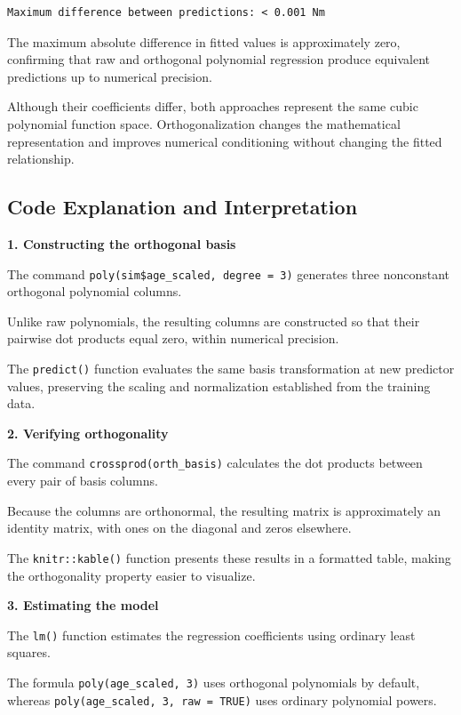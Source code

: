 \documentclass[
  letterpaper,
  DIV=11,
  numbers=noendperiod]{scrreprt}
\begin{document}
\begin{verbatim}
Maximum difference between predictions: < 0.001 Nm
\end{verbatim}

The maximum absolute difference in fitted values is approximately zero,
confirming that raw and orthogonal polynomial regression produce
equivalent predictions up to numerical precision.

Although their coefficients differ, both approaches represent the same
cubic polynomial function space. Orthogonalization changes the
mathematical representation and improves numerical conditioning without
changing the fitted relationship.

\subsection{Code Explanation and
Interpretation}\label{code-explanation-and-interpretation-2}

\textbf{1. Constructing the orthogonal basis}

The command \texttt{poly(sim\$age\_scaled,\ degree\ =\ 3)} generates
three nonconstant orthogonal polynomial columns.

Unlike raw polynomials, the resulting columns are constructed so that
their pairwise dot products equal zero, within numerical precision.

The \texttt{predict()} function evaluates the same basis transformation
at new predictor values, preserving the scaling and normalization
established from the training data.

\textbf{2. Verifying orthogonality}

The command \texttt{crossprod(orth\_basis)} calculates the dot products
between every pair of basis columns.

Because the columns are orthonormal, the resulting matrix is
approximately an identity matrix, with ones on the diagonal and zeros
elsewhere.

The \texttt{knitr::kable()} function presents these results in a
formatted table, making the orthogonality property easier to visualize.

\textbf{3. Estimating the model}

The \texttt{lm()} function estimates the regression coefficients using
ordinary least squares.

The formula \texttt{poly(age\_scaled,\ 3)} uses orthogonal polynomials
by default, whereas \texttt{poly(age\_scaled,\ 3,\ raw\ =\ TRUE)} uses
ordinary polynomial powers.
\end{document}
